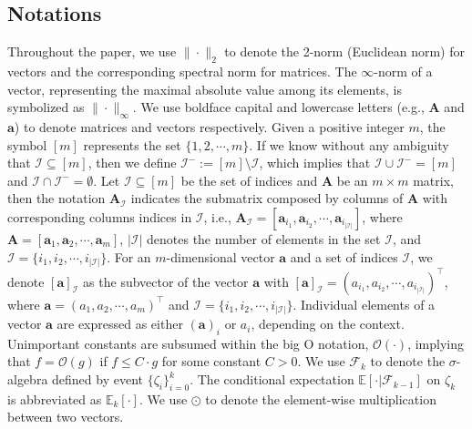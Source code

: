 \documentclass[aos]{imsart}
\numberwithin{equation}{section}
\theoremstyle{plain}
\begin{document}
\subsection{Notations} Throughout the paper, we use $\|\cdot\|_2$ to denote the 2-norm (Euclidean norm) for vectors and the corresponding spectral norm for matrices. The $\infty$-norm of a vector, representing the maximal absolute value among its elements, is symbolized as $\|\cdot\|_{\infty}$. We use boldface capital and lowercase letters (e.g., $\bm{A}$ and $\bm{a}$) to denote matrices and vectors respectively. Given a positive integer $m$, the symbol $[m]$ represents the set $\{1, 2, \cdots, m\}$. If we know without any ambiguity that $\mathcal{I} \subseteq [m]$, then we define $\mathcal{I}^{-} := [m] \setminus \mathcal{I}$, which implies that $\mathcal{I} \cup \mathcal{I}^{-} = [m]$ and $\mathcal{I} \cap \mathcal{I}^{-} = \emptyset$. Let $\mathcal{I} \subseteq [m]$ be the set of indices and $\bm{A}$ be an $m \times m$ matrix, then the notation $\bm{A}_{\mathcal{I}}$ indicates the submatrix composed by columns of $\bm{A}$ with corresponding columns indices in $\mathcal{I}$, i.e., $\bm{A}_{\mathcal{I}} = [\bm{a}_{i_1}, \bm{a}_{i_2}, \cdots, \bm{a}_{i_{|\mathcal{I}|}}]$, where $\bm{A} = [\bm{a}_1, \bm{a}_2, \cdots, \bm{a}_{m}]$, $|\mathcal{I}|$ denotes the number of elements in the set $\mathcal{I}$, and $\mathcal{I} = \{i_1, i_2, \cdots, i_{|\mathcal{I}|}\}$. For an $m$-dimensional vector $\bm{a}$ and a set of indices $\mathcal{I}$, we denote $[\bm{a}]_{\mathcal{I}}$ as the subvector of the vector $\bm{a}$ with $[\bm{a}]_{\mathcal{I}} = (a_{i_1}, a_{i_2}, \cdots, a_{i_{|\mathcal{I}|}})^{\top}$, where $\bm{a} = (a_{1}, a_{2}, \cdots, a_{m})^{\top}$ and $\mathcal{I} = \{i_1, i_2, \cdots, i_{|\mathcal{I}|}\}$. Individual elements of a vector $\bm{a}$ are expressed as either $(\bm{a})_i$ or $a_i$, depending on the context. 
Unimportant constants are subsumed within the big O notation, $\mathcal{O}(\cdot)$, implying that $f = \mathcal{O}(g)$ if $f \leq C \cdot g$ for some constant $C > 0$. We use $\mathcal{F}_k$ to denote the $\sigma$-algebra defined by event $\{\zeta_{i}\}_{i=0}^{k}$. The conditional expectation $\mathbb{E}\left[\cdot | \mathcal{F}_{k-1}\right]$ on $\zeta_k$ is abbreviated as $\mathbb{E}_k\left[\cdot\right]$. We use $\odot$ to denote the element-wise multiplication between two vectors. 
\end{document}
